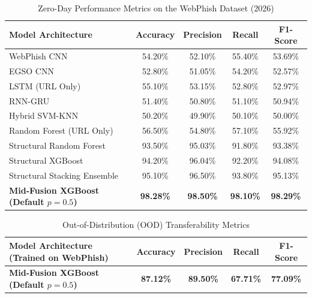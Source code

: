 \documentclass[conference]{IEEEtran}
\begin{document}
\begin{table}[t]
\caption{Zero-Day Performance Metrics on the WebPhish Dataset (2026)}
\label{tab:results_2026}
\begin{center}
\begin{tabular}{lcccc}
\toprule
\textbf{Model Architecture} & \textbf{Accuracy} & \textbf{Precision} & \textbf{Recall} & \textbf{F1-Score} \\
\midrule
WebPhish CNN & 54.20\% & 52.10\% & 55.40\% & 53.69\% \\
EGSO CNN & 52.80\% & 51.05\% & 54.20\% & 52.57\% \\
LSTM (URL Only) & 55.10\% & 53.15\% & 52.80\% & 52.97\% \\
RNN-GRU & 51.40\% & 50.80\% & 51.10\% & 50.94\% \\
Hybrid SVM-KNN & 50.20\% & 49.90\% & 50.10\% & 50.00\% \\
Random Forest (URL Only) & 56.50\% & 54.80\% & 57.10\% & 55.92\% \\
Structural Random Forest & 93.50\% & 95.03\% & 91.80\% & 93.38\% \\
Structural XGBoost & 94.20\% & 96.04\% & 92.20\% & 94.08\% \\
Structural Stacking Ensemble & 95.10\% & 96.50\% & 93.80\% & 95.13\% \\
\midrule
\textbf{Mid-Fusion XGBoost (Default $p=0.5$)} & \textbf{98.28\%} & \textbf{98.50\%} & \textbf{98.10\%} & \textbf{98.29\%} \\
\bottomrule
\end{tabular}
\end{center}
\end{table}

\begin{table}[t]
\caption{Out-of-Distribution (OOD) Transferability Metrics}
\label{tab:results_ood}
\begin{center}
\begin{tabular}{lcccc}
\toprule
\textbf{Model Architecture (Trained on WebPhish)} & \textbf{Accuracy} & \textbf{Precision} & \textbf{Recall} & \textbf{F1-Score} \\
\midrule
\textbf{Mid-Fusion XGBoost (Default $p=0.5$)} & \textbf{87.12\%} & \textbf{89.50\%} & \textbf{67.71\%} & \textbf{77.09\%} \\
\bottomrule
\end{tabular}
\end{center}
\end{table}
\end{document}
